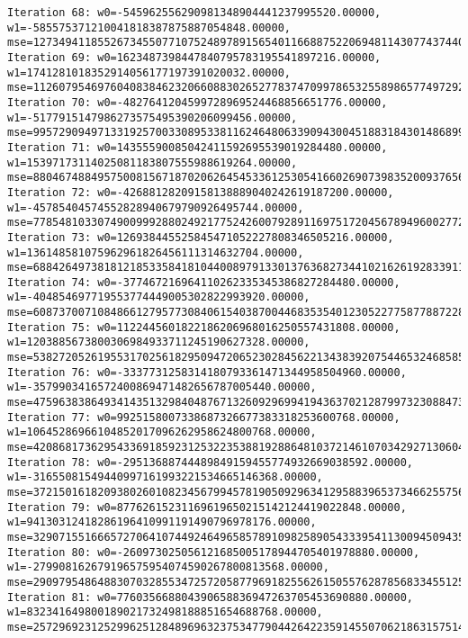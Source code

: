 \documentclass[11pt]{article}
\begin{document}
\begin{Verbatim}[commandchars=\\\{\}]
Iteration 68: w0=-545962556290981348904441237995520.00000, w1=-585575371210041818387875887054848.00000, mse=1273494118552673455077107524897891565401166887522069481143077437440.00000
Iteration 69: w0=1623487398447840795783195541897216.00000, w1=1741281018352914056177197391020032.00000, mse=11260795469760408384623206608830265277837470997865325589865774972928.00000
Iteration 70: w0=-4827641204599728969524468856651776.00000, w1=-5177915147986273575495390206099456.00000, mse=99572909497133192570033089533811624648063390943004518831843014868992.00000
Iteration 71: w0=14355590085042411592695539019284480.00000, w1=15397173114025081183807555988619264.00000, mse=880467488495750081567187020626454533612530541660269073983520093765632.00000
Iteration 72: w0=-42688128209158138889040242619187200.00000, w1=-45785404574552828940679790926495744.00000, mse=7785481033074900999288024921775242600792891169751720456789496002772992.00000
Iteration 73: w0=126938445525845471052227808346505216.00000, w1=136148581075962961826456111314632704.00000, mse=68842649738181218533584181044008979133013763682734410216261928339111936.00000
Iteration 74: w0=-377467216964110262335345386827284480.00000, w1=-404854697719553774449005302822993920.00000, mse=608737007108486612795773084061540387004468353540123052277587788722864128.00000
Iteration 75: w0=1122445601822186206968016250557431808.00000, w1=1203885673800306984933711245190627328.00000, mse=5382720526195531702561829509472065230284562213438392075446532468585267200.00000
Iteration 76: w0=-3337731258314180793361471344958504960.00000, w1=-3579903416572400869471482656787005440.00000, mse=47596383864934143513298404876713260929699419436370212879973230884736204800.00000
Iteration 77: w0=9925158007338687326677383318253600768.00000, w1=10645286966104852017096262958624800768.00000, mse=420868173629543369185923125322353881928864810372146107034292713060460134400.00000
Iteration 78: w0=-29513688744489849159455774932669038592.00000, w1=-31655081549440997161993221534665146368.00000, mse=3721501618209380260108234567994578190509296341295883965373466255756944736256.00000
Iteration 79: w0=87762615231169619650215142124419022848.00000, w1=94130312418286196410991191490796978176.00000, mse=32907155166657270641074492464965857891098258905433395411300945094356542423040.00000
Iteration 80: w0=-260973025056121685005178944705401978880.00000, w1=-279908162679196575954074590267800813568.00000, mse=290979548648830703285534725720587796918255626150557628785683345512559049441280.00000
Iteration 81: w0=776035668804390658836947263705453690880.00000, w1=832341649800189021732498188851654688768.00000, mse=2572969231252996251284896963237534779044264223591455070621863157514006654091264.00000

\end{Verbatim}
\end{document}
